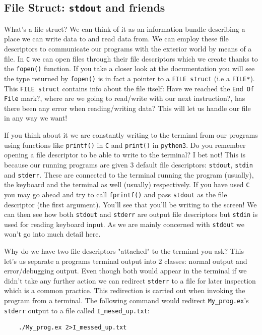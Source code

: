 \documentclass[12pt]{article}
\newcommand{\newpar} {
    \vskip 1cm
}
\begin{document}
	\subsection{File Struct: \texttt{stdout} and friends}
		What's a file struct? We can think of it as an information bundle describing a place we can write data to and read data from. We can employ these file descriptors to communicate our programs with the exterior world by means of a file. In \texttt{C} we can open files through their file descriptors which we create thanks to the \texttt{fopen()} function. If you take a closer look at the documentation you will see the type returned by \texttt{fopen()} is in fact a pointer to a \texttt{FILE struct} (i.e a \texttt{FILE*}). This \texttt{FILE struct} contains info about the file itself: Have we reached the \texttt{End Of File} mark?, where are we going to read/write with our next instruction?, has there been any error when reading/writing data? This will let us handle our file in any way we want!
		\newpar
		If you think about it we are constantly writing to the terminal from our programs using functions like \texttt{printf()} in \texttt{C} and \texttt{print()} in \texttt{python3}. Do you remember opening a file descriptor to be able to write to the terminal? I bet not! This is because our running programs are given 3 default file descriptors: \texttt{stdout}, \texttt{stdin} and \texttt{stderr}. These are connected to the terminal running the program (usually), the keyboard and the terminal as well (usually) respectively. If you have used \texttt{C} you may go ahead and try to call \texttt{fprintf()} and pass \texttt{stdout} as the file descriptor (the first argument). You'll see that you'll be writing to the screen! We can then see how both \texttt{stdout} and \texttt{stderr} are output file descriptors but \texttt{stdin} is used for reading keyboard input. As we are mainly concerned with \texttt{stdout} we won't go into much detail here.
		\newpar
		Why do we have two file descriptors "attached" to the terminal you ask? This let's us separate a programs terminal output into 2 classes: normal output and error/debugging output. Even though both would appear in the terminal if we didn't take any further action we can redirect \texttt{stderr} to a file for later inspection which is a common practice. This redirection is carried out when invoking the program from a terminal. The following command would redirect \texttt{My\_prog.ex}'s \texttt{stderr} output to a file called \texttt{I\_mesed\_up.txt}:

		\begin{verbatim}
	./My_prog.ex 2>I_messed_up.txt
		\end{verbatim}
\end{document}
